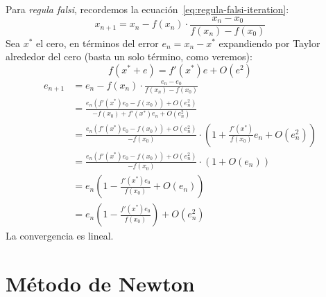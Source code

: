   Para \emph{\foreignlanguage{latin}{regula falsi}},
  recordemos la ecuación~\eqref{eq:regula-falsi-iteration}:
  \begin{equation}
    x_{n+1}
      = x_n - f(x_n) \cdot \frac{x_n - x_0}{f(x_n) - f(x_0)}
  \end{equation}
  Sea \(x^*\) el cero,
  en términos del error \(e_n = x_n - x^*\)
  expandiendo por Taylor alrededor del cero
  (basta un solo término,
   como veremos):
  \begin{equation*}
    f(x^* + e)
      = f'(x^*) e + O(e^2)
  \end{equation*}
  \begin{align*}
    e_{n+1}
      &= e_n - f(x_n) \cdot \frac{e_n - e_0}{f(x_n) - f(x_0)} \\
      &= \frac{e_n (f'(x^*) e_0 - f(x_0)) + O(e_n^2)}
              {- f(x_0) + f'(x^*) e_n + O(e_n^2)} \\
      &= \frac{e_n (f'(x^*) e_0 - f(x_0)) + O(e_n^2)}{-f(x_0)}
           \cdot \left( 1 + \frac{f'(x^*)}{f(x_0)} e_n + O(e_n^2) \right) \\
      &= \frac{e_n (f'(x^*) e_0 - f(x_0)) + O(e_n^2)}{-f(x_0)}
           \cdot (1 + O(e_n)) \\
      &= e_n \left(
               1 - \frac{f'(x^*) e_0}{f(x_0)}
                 + O(e_n)
             \right) \\
      &= e_n \left( 1 - \frac{f'(x^*) e_0}{f(x_0)} \right) + O(e_n^2)
  \end{align*}
  La convergencia es lineal.

\section{Método de Newton}


